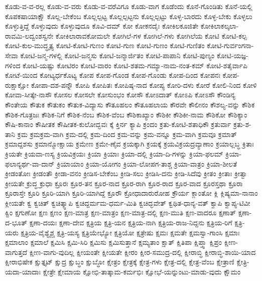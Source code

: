 {ಕೊಡು-ವ-ವ-ರಲ್ಲ
ಕೊಡು-ವ-ವರು
ಕೊಡು-ವ-ವರೆವಿಗೂ
ಕೊಡು-ವಾಗ
ಕೊಡೆಂದು
ಕೊನೆ-ಗೊಂಡಿತು
ಕೊನೆ-ಯಲ್ಲಿ
ಕೊಪಕಷಾಯಾಕ್ಷೌ
ಕೊಲ್ಲ-ಬೇಕೆಂಬ
ಕೊಲ್ಲಲ್ಪಟ್ಟ
ಕೊಲ್ಲಲ್ಪಟ್ಟನು
ಕೊಲ್ಲಲ್ಪಟ್ಟು
ಕೊಳ್ಳ-ಬಾರದು
ಕೊಳ್ಳ-ಬೇಕು
ಕೊಳ್ಳಲು
ಕೊಳ್ಳುತ್ತಿದ್ದೆ
ಕೊಳ್ಳುವುದು
ಕೊಳ್ಳುವುದೂ
ಕೊವಿ-ದಮ್
ಕೋ
ಕೋಕನದೈಃ
ಕೋಕಿಲಕೂಜಿತೇ
ಕೋಕಿಲಾಕಲ್ಕಲಾ-ರಾವಮಿ-ಲದ್ವಂಶಸ್ವನೇ
ಕೋಕಿಲಾರಾವಕೋಮಲೇ
ಕೋಗಿಲೆ-ಗಳ
ಕೋಗಿಲೆ-ಗಳು
ಕೋಗಿಲೆಯ
ಕೋಟಿ
ಕೋಟಿ-ಕಲ್ಪ
ಕೋಟಿ-ಕುಲ-ಮುದ್ಧೃತ್ಯ
ಕೋಟಿ-ಕೋಟಿ-ಗುಣಂ
ಕೋಟಿ-ಗುಣ
ಕೋಟಿ-ಗುಣಂ
ಕೋಟಿ-ಗುಣಿತಂ
ಕೋಟಿ-ಗುರ್ವಂಗನಾ-ಸೇವಾ
ಕೋಟಿ-ಜನ್ಮ-ಗಳಲ್ಲಿ
ಕೋಟಿ-ಜನ್ಮಸು
ಕೋಟಿ-ಜನ್ಮಾರ್ಜಿತಂ
ಕೋಟಿ-ಪಾಪಾನಿ
ಕೋಟಿ-ಪುಣ್ಯಂ
ಕೋಟಿ-ಯಜ್ಞ-ಗಳಿಂದ
ಕೋಟಿ-ಯಷ್ಟು
ಕೋಟಿರಂ
ಕೋಟಿ-ವಾರಂ
ಕೋಟಿ-ಶತಮ-ಗಮ್ಯಾ-ನಾಮ-ನಂತ-ಕಮ್
ಕೋಟಿ-ಶತೈರ್ವಾಪಿ
ಕೋಟೆ-ಯಿಂದ
ಕೋಟ್ಯರ್ಧಕೊಟ್ಯ
ಕೋಪ
ಕೋಪ-ಗೊಂಡ
ಕೋಪ-ಗೊಂಡು
ಕೋಪ-ದಿಂದ
ಕೋಪನಃ
ಕೋಪ-ರುಕ್ಷಾಕ್ಷೋ
ಕೋಪಾ-ದಶ-ಪನ್ನೌ
ಕೋಪಿ
ಕೋಪಿತಃ
ಕೋಪಿಷ್ಠ-ನಾದ
ಕೋಪ್ಯ
ಕೋರಿ-ದಳು
ಕೋರೆ
ಕೋಲಿ-ನಿಂದ
ಕೋಳಿ
ಕೋವಾ-ಸೀತ್ಕೇ-ನಾಸೌ
ಕೋಸಲ
ಕೋಸಲೇ
ಕೋಸುಂಭಂ
ಕೋಸೌ
ಕೋಽದಾತ್
ಕೋಽಪಿ
ಕೋಽಸೌ
ಕೌಂಡಿನ್ಯ
ಕೌಂತೇಯ
ಕೌತುಕ
ಕೌತುಕಂ
ಕೌತುಕ-ವಿದ್ಯಾಸು
ಕೌತೂಹಲಂ
ಕೌತೂಹಲಾಯ
ಕೌರವೇ
ಕೌಲೀನಂ
ಕೌಶಲ್ಯ-ವನ್ನು
ಕೌಶಿಕ
ಕೌಶಿಕ-ಗೊತ್ರಜಃ
ಕೌಶಿಕ-ನಿಗೆ
ಕೌಶಿಕ-ನೆಂಬ
ಕೌಶಿಕ-ವೆಂಬ
ಕೌಶಿಕಾಖ್ಯಾಂ
ಕೌಶಿಕೀ
ಕೌಶಿಕೀ-ನಾಮ
ಕೌಶಿಕೋ
ಕೌಶಿಕ್ಯಾಂ
ಕೌಷಿ-ಕಾನಾಂ
ಕೌಷೀತಕ
ಕೌಷೀತಕ-ಕುಲೋದ್ಭವಃ
ಕ್ಕೆ
ಕ್ತಿರ್ನ
ಕ್ಯಾಪಿ
ಕ್ರಂದಂ
ಕ್ರತು-ಕೋಟಿ-ಶತಾಧಿಕೌ
ಕ್ರತುರ್ವಾ
ಕ್ರತು-ಶ-ತಾನಿ
ಕ್ರಮ
ಕ್ರಮಕ್ರಮ-ವಾಗಿ
ಕ್ರಮ-ದಲ್ಲಿ
ಕ್ರಮ-ದಿಂದ
ಕ್ರಮ-ವನ್ನು
ಕ್ರಮ-ವನ್ನೂ
ಕ್ರಮ-ವಾಗಿ
ಕ್ರಮವೂ
ಕ್ರಮಾತ್
ಕ್ರಮಾದ್ದಶಸು
ಕ್ರಮಾನ್ಮೋಕ್ಷಾಯ
ಕ್ರಮೇಣ
ಕ್ರಮೇ-ಣೈವ
ಕ್ರಯಕ್ಕಾಗಿ
ಕ್ರಯಕ್ಕೆ
ಕ್ರಯವಿಕ್ರಯದ್ರವ್ಯಾಣಾಂ
ಕ್ರಯಾಲ್ಲಬ್ಧ
ಕ್ರಿತಾಃ
ಕ್ರಿಯತೇ
ಕ್ರಿಯವಾ-ಣಸ್ಯ
ಕ್ರಿಯವಿಕ್ರಯಃ
ಕ್ರಿಯಾ
ಕ್ರಿಯಾಃ
ಕ್ರಿಯಾ-ದಲ್ಲಿ
ಕ್ರಿಯಾ-ದಿ-ಗಳನ್ನು
ಕ್ರಿಯಾ-ಫಲಮ್
ಕ್ರಿಯಾ-ಫಲಾನ್ಯರ್ಥ-ವಾ-ದಾನ್
ಕ್ರಿಯಾಯಾಂ
ಕ್ರಿಯಾ-ಯೋಗಂ
ಕ್ರಿಯಾ-ಲೋಪಗ-ತಾಶ್ಚ
ಕ್ರಿಯಾ-ವಾತ್ರಂ
ಕ್ರಿಯಾ-ಶೀಲತೆ
ಕ್ರೀಡಂತೋಃ
ಕ್ರೀಡಂತೌ
ಕ್ರೀಡಾ-ವನಂ
ಕ್ರೀಡಿಸ-ಬೇಕೆಂಬ
ಕ್ರೀಡಿ-ಸಲು
ಕ್ರೀಡಿಸಿ-ದನು
ಕ್ರೀಡಿ-ಸಿದೆವು
ಕ್ರೀತಂ
ಕ್ರೀತಾಃ
ಕ್ರೀತ್ವಾ
ಕ್ರೀಯತೇ
ಕ್ರುದ್ಧ
ಕ್ರುಧಾ
ಕ್ರೂರಃ
ಕ್ರೂರ-ತನ
ಕ್ರೂರ-ನಾದ
ಕ್ರೂರ-ರಾಗಿ
ಕ್ರೂರ-ರಾದ
ಕ್ರೂರ-ವಾದ
ಕ್ರೂರಸ್ತಥಾ
ಕ್ರೂರಾ
ಕ್ರೂರಾಸ್ತೇ
ಕ್ರೂರಿ
ಕ್ರೂರಿ-ಯಾಗಿ
ಕ್ರೂರಿ-ಯಾಗಿದ್ದೆ
ಕ್ರೂರೌ
ಕ್ರೋಧಾದಾರುರೋಹ
ಕ್ರೌರ್ಯ
ಕ್ಲಾಂತೋ
ಕ್ಲಿ
ಕ್ಲಿಷ್ಯಮಾ-ನಾನಾಂ
ಕ್ಲೀಯತೇ
ಕ್ವ
ಕ್ವಚಿತ್
ಕ್ವಚಿತ್ಕ್ವಾಪಿ
ಕ್ವಚಿದ್ದರ್ಮಮ-ಧರ್ಮ-ಮಿತಿ
ಕ್ವಚಿದ್ಭವೇತ್
ಕ್ವಥಿತ-ಧಾನ್ಯ-ವತ್
ಕ್ವಾಪಿ
ಕ್ವಾಪ್ಯ-ಟಿವೀ
ಕ್ವಿಂ
ಕ್ಷಗುಣೋ
ಕ್ಷಣ
ಕ್ಷಣಂ
ಕ್ಷಣ-ಮಾತ್ರ
ಕ್ಷಣ-ಮಾತ್ರಂ
ಕ್ಷಣ-ಮಾತ್ರ-ದಲ್ಲಿ
ಕ್ಷಣ-ಮುತಿ
ಕ್ಷಣ-ವಾದರೂ
ಕ್ಷಣಾತ್
ಕ್ಷಣಾ-ದ-ಭೂತ್
ಕ್ಷಣಾ-ದಯಃ
ಕ್ಷಣಾ-ದೇವ
ಕ್ಷತ್ರಿಯ
ಕ್ಷತ್ರಿ-ಯನ
ಕ್ಷತ್ರಿಯ-ನಾಗಿ
ಕ್ಷತ್ರಿಯ-ರಾಜ-ನಿದ್ದನು
ಕ್ಷತ್ರಿಯ-ರಿಗೆ
ಕ್ಷತ್ರಿ-ಯರು
ಕ್ಷತ್ರಿಯ-ವೈಶ್ಯೈಶ್ಚ
ಕ್ಷತ್ರಿ-ಯಸ್ಯ
ಕ್ಷತ್ರಿಯೇಭ್ಯೋ
ಕ್ಷತ್ರಿಯೋ
ಕ್ಷತ್ರೇಷು
ಕ್ಷಮಃ
ಕ್ಷಮತೇ
ಕ್ಷಮಸ್ವಾ-ಗಾಂಸಿ
ಕ್ಷಮಾಃ
ಕ್ಷಮಾಲಾಂ
ಕ್ಷಮಾಲೆ
ಕ್ಷಮಿಸಿ
ಕ್ಷಮಿ-ಸಿರಿ
ಕ್ಷಮಿಸು
ಕ್ಷಮಿಸುತ್ತಾನೆ
ಕ್ಷಮ್ಯತಾಂ
ಕ್ಷಾತ್
ಕ್ಷಿತಿಪಾ
ಕ್ಷಿಪ್ತ್ವಾ
ಕ್ಷಿಪ್ರಂ
ಕ್ಷೀಣ-ವಾಗುತ್ತದೆ
ಕ್ಷೀಣ-ವಾಗು-ವುದಿಲ್ಲ
ಕ್ಷೀಯಂತೇ
ಕ್ಷೀಯತೇ
ಕ್ಷೀರಂ
ಕ್ಷೀರ-ಸಮುದ್ರ-ದಲ್ಲಿ
ಕ್ಷೀರಾಬ್ಧಿ
ಕ್ಷೀರಾಬ್ಧಿ-ಶಾಯಿ-ಯಾದ
ಕ್ಷೀರಾಭಿಷೇಕ
ಕ್ಷುತ್ತೃಟ್
ಕ್ಷುದ್ರ
ಕ್ಷುಬ್ಧಂ
ಕ್ಷುಬ್ಧೋ
ಕ್ಷೇತ್ರಂ
ಕ್ಷೇತ್ರಕ್ಕೆ
ಕ್ಷೇತ್ರ-ಗಳು
ಕ್ಷೇತ್ರ-ದಲ್ಲಿ
ಕ್ಷೇತ್ರ-ವೆಂಬ
ಕ್ಷೇತ್ರಾಣಿ
ಕ್ಷೇತ್ರಿ-ಯದಾ-ಯಾದಾಃ
ಕ್ಷೇತ್ರೇ
ಕ್ಷೇಮಾಯ
ಕ್ಷೋಭಿ-ತಾತ್ಕಾಮ-ಕರ್ಮಭಿಃ
ಕ್ಷೋಭೆ-ಯನ್ನುಂಟು-ಮಾಡು-ವುದು
ಕ್ಷೌಮಂ
}

